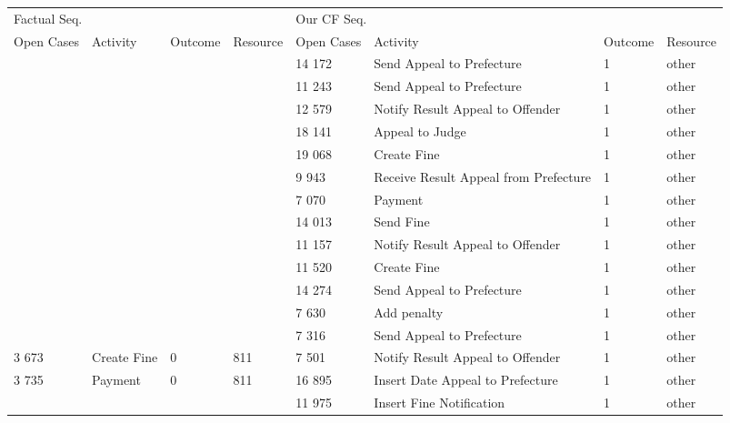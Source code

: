 \begin{tabular}{llllllll}
\toprule
\multicolumn{4}{l}{Factual Seq.} & \multicolumn{4}{l}{Our CF Seq.} \\
Open Cases & Activity & Outcome & Resource & Open Cases & Activity & Outcome & Resource \\
\midrule
 &  &  &  & 14 172 & Send Appeal to Prefecture & 1 & other \\
 &  &  &  & 11 243 & Send Appeal to Prefecture & 1 & other \\
 &  &  &  & 12 579 & Notify Result Appeal to Offender & 1 & other \\
 &  &  &  & 18 141 & Appeal to Judge & 1 & other \\
 &  &  &  & 19 068 & Create Fine & 1 & other \\
 &  &  &  & 9 943 & Receive Result Appeal from Prefecture & 1 & other \\
 &  &  &  & 7 070 & Payment & 1 & other \\
 &  &  &  & 14 013 & Send Fine & 1 & other \\
 &  &  &  & 11 157 & Notify Result Appeal to Offender & 1 & other \\
 &  &  &  & 11 520 & Create Fine & 1 & other \\
 &  &  &  & 14 274 & Send Appeal to Prefecture & 1 & other \\
 &  &  &  & 7 630 & Add penalty & 1 & other \\
 &  &  &  & 7 316 & Send Appeal to Prefecture & 1 & other \\
3 673 & Create Fine & 0 & 811 & 7 501 & Notify Result Appeal to Offender & 1 & other \\
3 735 & Payment & 0 & 811 & 16 895 & Insert Date Appeal to Prefecture & 1 & other \\
 &  &  &  & 11 975 & Insert Fine Notification & 1 & other \\
\bottomrule
\end{tabular}
